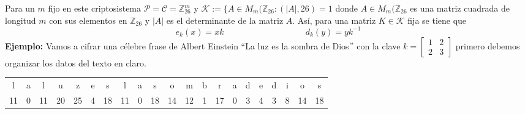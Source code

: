Para un $m$ fijo en este criptosistema $\mathcal{P}=\mathcal{C}=\mathbb{Z}_{26}^m$ y $\mathcal{K}:=\{A\in M_m(\mathbb{Z}_{26}:(|A|,26)=1$ donde $A\in M_m(\mathbb{Z}_{26}$ es una matriz cuadrada de longitud $m$ con sus elementos en $\mathbb{Z}_{26}$ y $|A|$ es el determinante de la matriz $A$. Así, para una matriz $K\in\mathcal{K}$ fija se tiene que
\begin{equation*}
    e_k(x)=xk\hspace{4cm} d_k(y)=yk^{-1}
\end{equation*}
\textbf{Ejemplo: }Vamos a cifrar una célebre frase de Albert Einstein ``La luz es la sombra de Dios$"$ con la clave $k=\begin{bmatrix}
    1 & 2\\
    2 & 3
    \end{bmatrix}$ primero debemos organizar los datos del texto en claro.
\begin{center}
\begin{tabular}{c c c c c c c c c c c c c c c c c c c c c }
    l & a & l & u & z & e & s & l & a & s & o & m & b & r & a & d & e & d & i & o & s\\
    11 & 0 & 11 & 20 & 25 & 4 & 18 & 11 & 0 & 18 & 14 & 12 & 1 & 17 & 0 & 3 & 4 & 3 & 8 & 14 & 18
\end{tabular}
\end{center}
\vspace{5mm}
